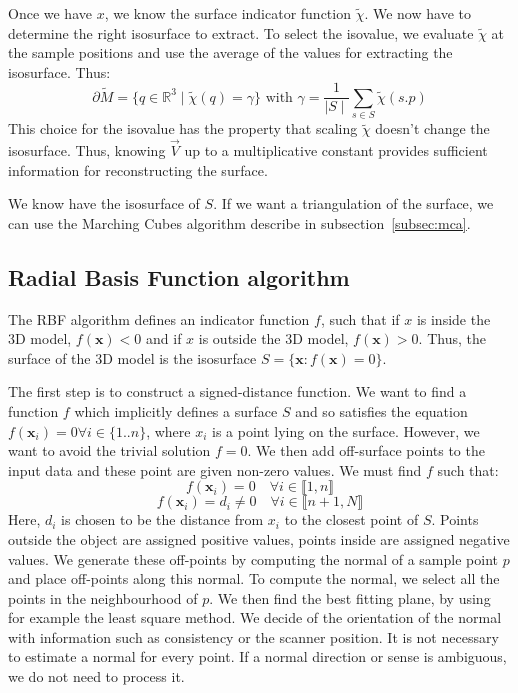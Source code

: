 \documentclass[12pt]{article}
\begin{document}
Once we have $x$, we know the surface indicator function $\tilde{\chi}$. We now have to determine the right isosurface to extract. To select the isovalue, we evaluate $\tilde{\chi}$ at the sample positions and use the average of the values for extracting the isosurface. Thus:
$$\partial\tilde{M} = \{q \in \mathbb{R}^3 \mid \tilde{\chi}(q) = \gamma\} \text{ with } \gamma = \frac{1}{\mid S\mid}\sum_{s \in S}\tilde{\chi}(s.p)$$
This choice for the isovalue has the property that scaling $\tilde{\chi}$ doesn't change the isosurface. Thus, knowing $\vec{V}$ up to a multiplicative constant provides sufficient information for reconstructing the surface.

We know have the isosurface of $S$. If we want a triangulation of the surface, we can use the Marching Cubes algorithm describe in subsection~\ref{subsec:mca}.

\subsection{Radial Basis Function algorithm}
The RBF algorithm defines an indicator function $f$, such that if $x$ is inside the 3D model, $f(\boldsymbol{x}) < 0$ and if $x$ is outside the 3D model, $f(\boldsymbol{x}) > 0$. Thus, the surface of the 3D model is the isosurface $S = \{\boldsymbol{x}: f(\boldsymbol{x}) =0\}$.

The first step is to construct a signed-distance function. We want to find a function $f$ which implicitly defines a surface $S$ and so satisfies the equation $f(\boldsymbol{x}_i) = 0 \forall i \in \{1..n\}$, where $x_i$ is a point lying on the surface. However, we want to avoid the trivial solution $f = 0$. We then add off-surface points to the input data and these point are given non-zero values. We must find $f$ such that:
$$f(\boldsymbol{x}_i) = 0 \hspace{1em}\forall i \in \llbracket 1,n\rrbracket$$
$$f(\boldsymbol{x}_i) = d_i \ne 0 \hspace{1em}\forall i \in\llbracket n+1,N\rrbracket$$
Here, $d_i$ is chosen to be the distance from $x_i$ to the closest point of $S$. Points outside the object are assigned positive values, points inside are assigned negative values. We generate these off-points by computing the normal of a sample point $p$ and place off-points along this normal. To compute the normal, we select all the points in the neighbourhood of $p$. We then find the best fitting plane, by using for example the least square method. We decide of the orientation of the normal with information such as consistency or the scanner position. It is not necessary to estimate a normal for every point. If a normal direction or sense is ambiguous, we do not need to process it.
\end{document}
